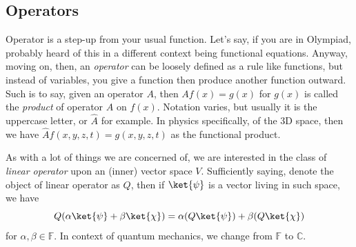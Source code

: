 \subsection{Operators}
Operator is a step-up from your usual function. Let's say, if you are in Olympiad, probably heard of this in a different context being functional equations. Anyway, moving on, then, an \textit{operator} can be loosely defined as a rule like functions, but instead of variables, you give a function then produce another function outward. Such is to say, given an operator $A$, then $Af(x)=g(x)$ for $g(x)$ is called the \textit{product} of operator $A$ on $f(x)$. Notation varies, but usually it is the uppercase letter, or $\hat{A}$ for example. In physics specifically, of the 3D space, then we have $\hat{A}f(x,y,z,t)=g(x,y,z,t)$ as the functional product. 

As with a lot of things we are concerned of, we are interested in the class of \textit{linear operator} upon an (inner) vector space $V$. Sufficiently saying, denote the object of linear operator as $Q$, then if $\ket{\psi}$ is a vector living in such space, we have 
\begin{equation}
    Q(\alpha \ket{\psi}+ \beta \ket{\chi}) = \alpha(Q\ket{\psi}) + \beta (Q\ket{\chi})
\end{equation}
for $\alpha,\beta\in\mathbb{F}$. In context of quantum mechanics, we change from $\mathbb{F}$ to $\mathbb{C}$. 

